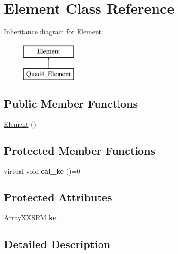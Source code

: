 \hypertarget{class_element}{}\section{Element Class Reference}
\label{class_element}
Inheritance diagram for Element\+:\begin{figure}[H]
\begin{center}
\leavevmode
\includegraphics[height=2.000000cm]{class_element}
\end{center}
\end{figure}
\subsection*{Public Member Functions}
\begin{DoxyCompactItemize}
\item 
\mbox{\hyperlink{class_element_ab0d0e20be9a36ae676202db753faeec9}{Element}} ()
\end{DoxyCompactItemize}
\subsection*{Protected Member Functions}
\begin{DoxyCompactItemize}
\item 
\mbox{\label{class_element_a6d39782237857b49ef63d8e7a0c4f4c3}} 
virtual void {\bfseries cal\+\_\+ke} ()=0
\end{DoxyCompactItemize}
\subsection*{Protected Attributes}
\begin{DoxyCompactItemize}
\item 
\mbox{\label{class_element_ade82c5d130fa5828e3d52c4065a36b85}} 
Array\+X\+X\+S\+RM {\bfseries ke}
\end{DoxyCompactItemize}


\subsection{Detailed Description}


